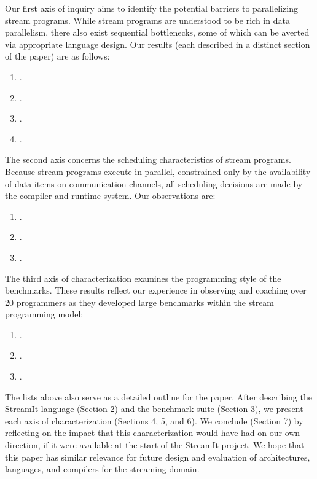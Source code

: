 Our first axis of inquiry aims to identify the potential barriers to
parallelizing stream programs.  While stream programs are understood
to be rich in data parallelism, there also exist sequential
bottlenecks, some of which can be averted via appropriate language
design.  Our results (each described in a distinct section of the
paper) are as follows:
\begin{enumerate}
\item {\slidingwindows}.
\item {\startup}.
\item {\stateful}.
\item {\feedback}.
\end{enumerate}

The second axis concerns the scheduling characteristics of stream
programs.  Because stream programs execute in parallel, constrained
only by the availability of data items on communication channels, all
scheduling decisions are made by the compiler and runtime system.  Our
observations are:
\begin{enumerate}
\item {\matchedrates}.
\item {\dynamicrates}.
\item {\cyclostatic}.
\end{enumerate}

The third axis of characterization examines the programming style of
the benchmarks.  These results reflect our experience in observing and
coaching over 20 programmers as they developed large benchmarks within
the stream programming model:
\begin{enumerate}
\item {\structuredstreams}.
\item {\accidentalstate}.
\item {\teleportmessaging}.
\end{enumerate}

The lists above also serve as a detailed outline for the paper.  After
describing the StreamIt language (Section 2) and the benchmark suite
(Section 3), we present each axis of characterization (Sections 4, 5,
and 6).  We conclude (Section 7) by reflecting on the impact that this
characterization would have had on our own direction, if it were
available at the start of the StreamIt project.  We hope that this
paper has similar relevance for future design and evaluation of
architectures, languages, and compilers for the streaming domain.


